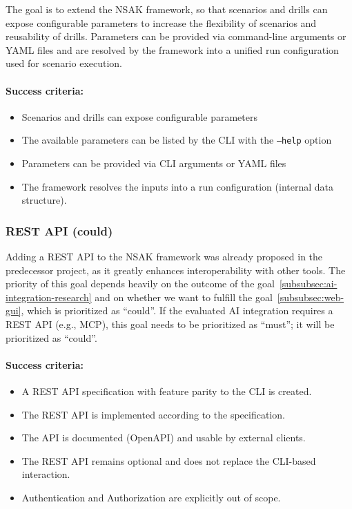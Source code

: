 The goal is to extend the \gls{NSAK} framework, so that scenarios and drills can expose configurable parameters to increase the flexibility of scenarios and reusability of drills.
Parameters can be provided via command-line arguments or \gls{YAML} files and are resolved by the framework into a unified run configuration used for scenario execution.

\paragraph{Success criteria:}

\begin{itemize}
	\item Scenarios and drills can expose configurable parameters
	\item The available parameters can be listed by the \gls{CLI} with the \texttt{--help} option
	\item Parameters can be provided via \gls{CLI} arguments or \gls{YAML} files
	\item The framework resolves the inputs into a run configuration (internal data structure).
\end{itemize}

\subsubsection{REST API (could)}\label{subsubsec:rest-api}

Adding a REST \gls{API} to the \gls{NSAK} framework was already proposed in the predecessor project, as it greatly enhances interoperability with other tools.
The priority of this goal depends heavily on the outcome of the goal~\ref{subsubsec:ai-integration-research} and on whether we want to fulfill the goal~\ref{subsubsec:web-gui}, which is prioritized as \enquote{could}.
If the evaluated \gls{AI} integration requires a \gls{REST API} (e.g., \gls{MCP}), this goal needs to be prioritized as \enquote{must}; it will be prioritized as \enquote{could}.

\paragraph{Success criteria:}

\begin{itemize}
	\item A REST \gls{API} specification with feature parity to the \gls{CLI} is created.
	\item The REST \gls{API} is implemented according to the specification.
	\item The \gls{API} is documented (OpenAPI) and usable by external clients.
	\item The REST \gls{API} remains optional and does not replace the \gls{CLI}-based interaction.
	\item Authentication and Authorization are explicitly out of scope.
\end{itemize}


